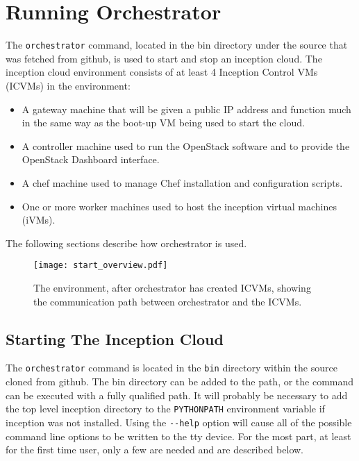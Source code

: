 \section{Running Orchestrator}
The \verb!orchestrator! command, located in the bin directory under the source that was fetched from github, 
is used to start and stop an inception cloud. 
The inception cloud environment consists of at least 4 Inception Control VMs (ICVMs)  in the environment:

\begin{itemize}
\item A gateway machine that will be given a public IP address and function much in the same way as the 
boot-up VM being used to start the cloud. 

\item A controller machine used to run the OpenStack software and to provide the OpenStack Dashboard interface. 

\item A chef machine used to manage Chef installation and configuration scripts. 

\item One or more worker machines used to host the inception virtual machines (iVMs). 
\end{itemize}

\noindent
The following sections describe how orchestrator is used. 

\begin{figure}
  \centering
  \texttt{[image: start\_overview.pdf]}
  \tiny
  \caption{\small The environment, after orchestrator has created ICVMs, showing the communication path between orchestrator and the ICVMs.
    \label{fg_overview} \normalsize
  }
  \normalsize
\end{figure}

\subsection{Starting The Inception Cloud}
The \verb!orchestrator! command is located in the \verb!bin! directory within the source cloned from github. 
The bin directory can be added to the path, or the command can be executed with a fully qualified path.  
It will probably be necessary to add the top level inception directory to the \verb!PYTHONPATH! environment variable
if inception was not installed. 
Using the \verb!--help! option will cause all of the possible command line options to be written to the tty device. 
For the most part, at least for the first time user, only a few are needed and are described below. 

